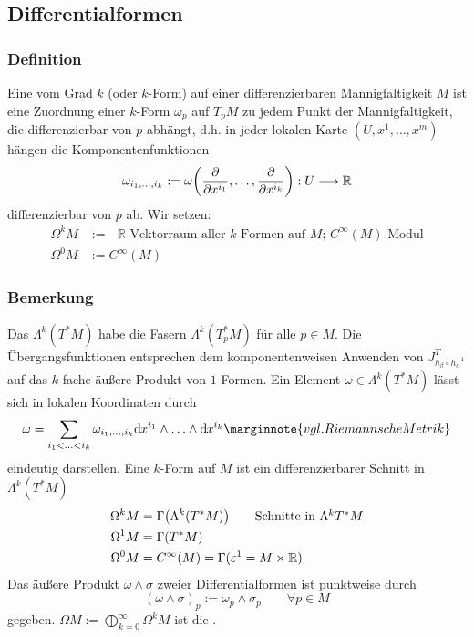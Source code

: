\subsection{Differentialformen} %
\label{sub:52}
\subsubsection[Definition: Differentialform]{Definition} %
\label{ssub:521}
Eine  vom Grad $k$ (oder $k$-Form) auf einer differenzierbaren Mannigfaltigkeit $M$ ist eine Zuordnung einer $k$-Form $\omega_p$ auf $T_p M$ zu 
jedem Punkt der Mannigfaltigkeit, die differenzierbar von $p$ abhängt, d.h. in jeder lokalen Karte $(U, x^1, \ldots , x^m)$ hängen die Komponentenfunktionen
\[
	\omega_{i_1, \ldots , i_k} := \omega \enbrace*{\diff{}{x^{i_1}}, \ldots , \diff{}{x^{i_k}}} : U \longrightarrow \mathds{R} 
\]
differenzierbar von $p$ ab. Wir setzen:
\begin{align*}
	\Omega^k M &:= \text{ $\mathds{R}$-Vektorraum aller $k$-Formen auf $M$; $C^\infty(M)$-Modul} \\
	\Omega^0 M &:= C^\infty(M)
\end{align*}

\subsubsection{Bemerkung} %
\label{ssub:522}
Das  $\Lambda^k(T^* M)$ habe die Fasern $\Lambda^k(T^*_p M)$ für alle $p \in M$. Die Übergangsfunktionen entsprechen dem komponentenweisen Anwenden von 
$J^T_{h_\beta \circ h_\alpha ^{-1}}$ auf das $k$-fache äußere Produkt von $1$-Formen. Ein Element $\omega \in \Lambda^k(T^* M)$ lässt sich in lokalen Koordinaten durch
\[
	\omega = \sum_{i_1 < \ldots < i_k} \omega_{i_1, \ldots , i_k} \mathd x^{i_1} \wedge \ldots \wedge \mathd x^{i_k} \marginnote{vgl. Riemannsche Metrik}
\]
eindeutig darstellen. Eine $k$-Form auf $M$ ist ein differenzierbarer Schnitt in $\Lambda^k(T^* M)$
\begin{align*}
	\Omega^k M &= \Gamma \enbrace*{\Lambda^k(T^* M)} \tag*{Schnitte in $\Lambda^k T^* M$} \\
	\Omega^1 M &= \Gamma (T^* M) \\
	\Omega^0 M &= C^\infty(M) = \Gamma (\varepsilon^1 = M \times \mathds{R})
\end{align*}
Das äußere Produkt $\omega \wedge \sigma$ zweier Differentialformen ist punktweise durch
\[
	(\omega \wedge \sigma)_p := \omega_p \wedge \sigma_p \qquad \forall p \in M
\]
gegeben. $\Omega M := \bigoplus_{k=0}^\infty \Omega^k M$ ist die . 

